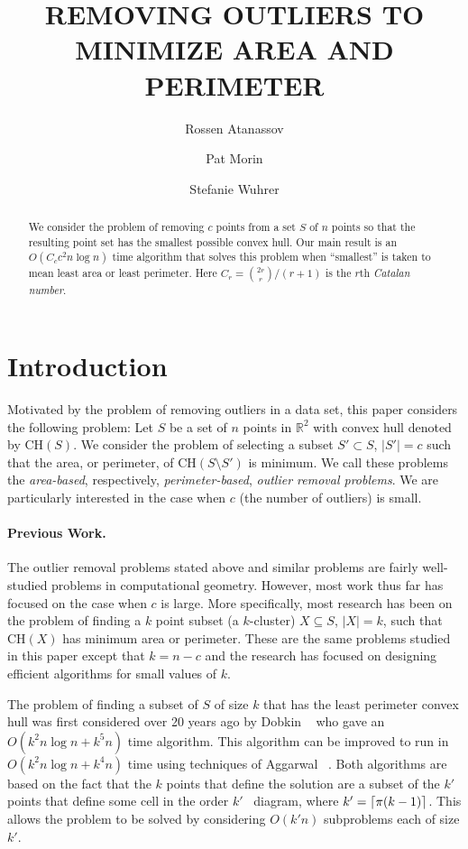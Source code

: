\documentclass[lotsofwhite]{patmorin}
\title{\MakeUppercase{Removing Outliers to Minimize Area and Perimeter}}
\author{Rossen Atanassov \and
    Pat Morin \and
    Stefanie Wuhrer}
\date{}
\newcommand{\ch}{\mathrm{CH}}
\newcommand{\ntypes}{C_c}
\newcommand{\timepertype}{c^2 n\log n}
\newcommand{\runtime}{\ntypes \timepertype}
\begin{document}
\maketitle

\begin{abstract}
We consider the problem of removing $c$ points from a set $S$ of $n$
points so that the resulting point set has the smallest possible
convex hull.  Our main result is an $O(\runtime)$ time algorithm
that solves this problem when ``smallest'' is taken to mean least area
or least perimeter. Here $C_r = {2r\choose r}/(r+1)$ is
the $r$th \emph{Catalan number}.
\end{abstract}

\section{Introduction}

Motivated by the problem of removing outliers in a data set, this
paper considers the following problem: Let $S$ be a set of $n$ points
in $\mathbb{R}^2$ with convex hull denoted by $\ch(S)$.  We consider
the problem of selecting a subset $S'\subset S$, $|S'|=c$ such that
the area, or perimeter, of $\ch(S\setminus S')$ is minimum.  We call
these problems the \emph{area-based}, respectively,
\emph{perimeter-based}, \emph{outlier removal problems}.  We are
particularly interested in the case when $c$ (the number of outliers)
is small.

\paragraph{Previous Work.} The outlier removal problems stated above
and similar problems are fairly well-studied problems in computational
geometry.  However, most work thus far has focused on the case when
$c$ is large. More specifically, most research has been on the problem
of finding a $k$ point subset (a $k$-cluster) $X\subseteq S$, $|X|=k$,
such that $\ch(X)$ has minimum area or perimeter. These are the same
problems studied in this paper except that $k=n-c$ and the research
has focused on designing efficient algorithms for small values of $k$.

The problem of finding a subset of $S$ of size $k$ that has the least
perimeter convex hull was first considered over 20 years ago by Dobkin
\etal\ \cite{ddg83} who gave an $O(k^2n\log n + k^5 n)$ time
algorithm.  This algorithm can be improved to run in $O(k^2 n\log n +
k^4 n)$ time using techniques of Aggarwal \etal\ \cite{aiks89}.  Both
algorithms are based on the fact that the $k$ points that define the
solution are a subset of the $k'$ points that define some cell in the
order $k'$ \voronoi\ diagram, where $k'=\left\lceil \pi (k-1) \right\rceil$.  This
allows the problem to be solved by considering $O(k'n)$ subproblems
each of size $k'$.
\end{document}
